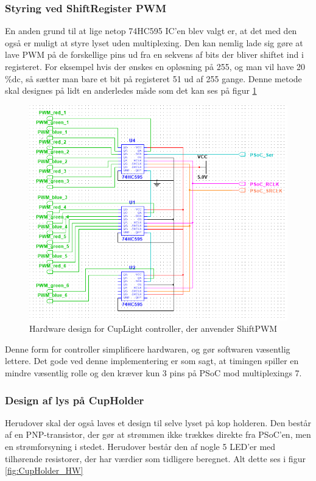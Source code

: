 \documentclass[HardwareDesign/HardwareDesign_main.tex]{subfiles}
\begin{document}
\subsubsection{Styring ved ShiftRegister PWM}
En anden grund til at lige netop 74HC595 IC'en blev valgt er, at det med den også er muligt at styre lyset uden multiplexing. Den kan nemlig lade sig gøre at lave PWM på de forskellige pins ud fra en sekvens af bits der bliver shiftet ind i registeret. For eksempel hvis der ønskes en opløsning på 255, og man vil have 20 \%dc, så sætter man bare et bit på registeret 51 ud af 255 gange.  Denne metode skal designes på lidt en anderledes måde som det kan ses på figur \ref{fig:CupLight_HW_ShiftPWM}
\begin{figure}[H]
    \centering
    \includegraphics[width=\textwidth]{HardwareDesign/CupLight/graphics/CupLight_HW_Controller.png}
    \caption{Hardware design for CupLight controller, der anvender ShiftPWM}
    \label{fig:CupLight_HW_ShiftPWM}
\end{figure}

Denne form for controller simplificere  hardwaren, og gør softwaren væsentlig lettere. Det gode ved denne implementering er som sagt, at timingen spiller en mindre væsentlig rolle og den kræver kun 3 pins på PSoC mod multiplexings 7.\\

\subsubsection{Design af lys på CupHolder}
Herudover skal der også laves et design til selve lyset på kop holderen. Den består af en PNP-transistor, der gør at strømmen ikke trækkes direkte fra PSoC'en, men en strømforsyning i stedet. Herudover består den af nogle 5 LED'er med tilhørende resistorer, der har værdier som tidligere beregnet. Alt dette ses i figur \ref{fig:CupHolder_HW}
\end{document}
